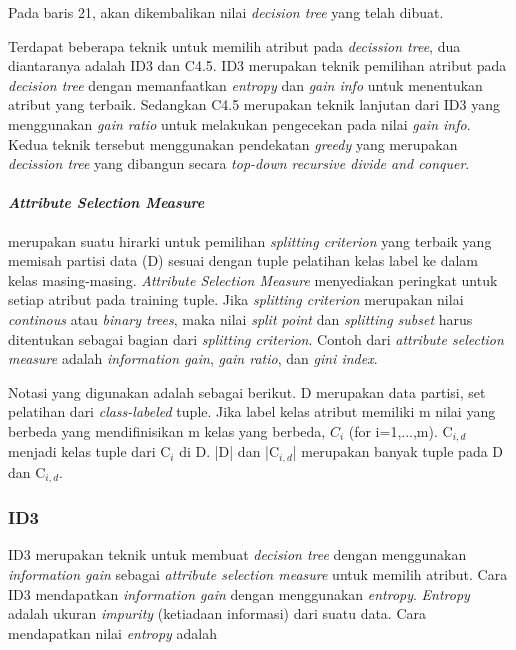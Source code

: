 Pada baris 21, akan dikembalikan nilai \textsl{decision tree} yang telah dibuat.

Terdapat beberapa teknik untuk memilih atribut pada \textsl{decission tree}, dua diantaranya adalah ID3 dan C4.5. ID3 merupakan teknik pemilihan atribut pada \textsl{decision tree} dengan memanfaatkan \textsl{entropy} dan \textsl{gain info} untuk menentukan atribut yang terbaik. Sedangkan C4.5 merupakan teknik lanjutan dari ID3 yang menggunakan \textsl{gain ratio} untuk melakukan pengecekan pada nilai \textsl{gain info}. Kedua teknik tersebut menggunakan pendekatan \textsl{greedy} yang merupakan \textsl{decission tree} yang dibangun secara \textsl{top-down recursive divide and conquer}. 

\paragraph{\textsl{Attribute Selection Measure}} merupakan suatu hirarki untuk pemilihan \textsl{splitting criterion} yang terbaik yang memisah partisi data (D) sesuai dengan tuple pelatihan kelas label ke dalam kelas masing-masing. \textsl{Attribute Selection Measure} menyediakan peringkat untuk setiap atribut pada training tuple. Jika \textsl{splitting criterion} merupakan nilai \textsl{continous} atau \textsl{binary trees}, maka nilai \textsl{split point} dan \textsl{splitting subset} harus ditentukan sebagai bagian dari \textsl{splitting criterion}. Contoh dari \textsl{attribute selection measure} adalah \textsl{information gain}, \textsl{gain ratio}, dan \textsl{gini index}.

Notasi yang digunakan adalah sebagai berikut. D merupakan data partisi, set pelatihan dari \textsl{class-labeled} tuple. Jika label kelas atribut memiliki m nilai yang berbeda yang mendifinisikan m kelas yang berbeda, $C_{i}$ (for i=1,...,m). C$_{i,d}$ menjadi kelas tuple dari C$_{i}$ di D. |D| dan |C$_{i,d}$| merupakan banyak tuple pada D dan C$_{i,d}$.

\subsubsection{ID3}

ID3 merupakan teknik untuk membuat \textsl{decision tree} dengan menggunakan \textsl{information gain} sebagai \textsl{attribute selection measure} untuk memilih atribut. Cara ID3 mendapatkan \textsl{information gain} dengan menggunakan \textsl{entropy}. \textsl{Entropy} adalah ukuran \textsl{impurity} (ketiadaan informasi) dari suatu data. Cara mendapatkan nilai \textsl{entropy} adalah

